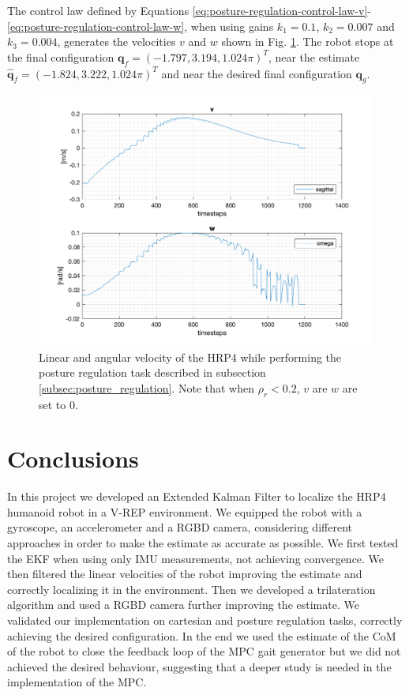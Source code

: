 \documentclass[a4paper]{article}
\begin{document}
The control law defined by Equations
\ref{eq:posture-regulation-control-law-v}-\ref{eq:posture-regulation-control-law-w},
when using gains $k_1=0.1$, $k_2=0.007$ and $k_3=0.004$,
generates the velocities $v$ and $w$ shown in Fig. \ref{fig:unicycle_velocities_posture_regulation}. The robot stops at the final
configuration $\bm{q}_f = (-1.797, 3.194, 1.024\pi)^T$, near the estimate
$\bm{\hat{q}}_f = (-1.824, 3.222, 1.024\pi)^T$ and
near the desired final configuration $\bm{q}_g$.
\begin{figure}
    \centering
    \includegraphics[width=\textwidth]{images/unicycle_velocities.png}
    \caption{Linear and angular velocity of the HRP4 while performing the
        posture regulation task described in subsection \ref{subsec:posture_regulation}.
        Note that when $\rho_r < 0.2$, $v$ are $w$ are set to 0.}
    \label{fig:unicycle_velocities_posture_regulation}
\end{figure}

\section{Conclusions}
In this project we developed an Extended Kalman Filter to localize the HRP4
humanoid robot in a V-REP environment. We equipped the robot with a gyroscope,
an accelerometer and a RGBD camera, considering different approaches in order
to make the estimate as accurate as possible. We first tested the EKF when
using only IMU measurements, not achieving convergence. We then filtered the
linear velocities of the robot improving the estimate and correctly localizing
it in the environment. Then we developed a trilateration algorithm
and used a RGBD camera further improving the estimate. We validated our
implementation on cartesian and posture regulation tasks, correctly
achieving the desired configuration. In the end we used the estimate of the
CoM of the robot to close the feedback loop of the MPC gait generator but we did not
achieved the desired behaviour, suggesting that a deeper study is needed in the
implementation of the MPC.
\end{document}
